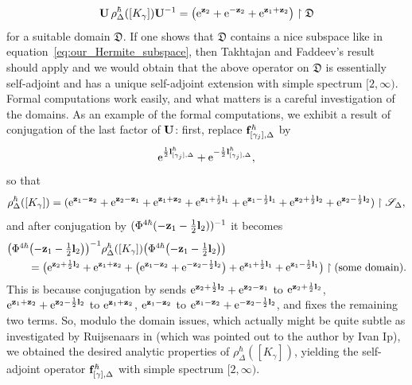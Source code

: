 \documentclass[10pt,a4paper]{amsart}
\numberwithin{equation}{section}
\theoremstyle{definition}
\begin{document}
\[
{\bf U} \, \rho^\hbar_\Delta([K_\gamma]) {\bf U}^{-1} = \bigl( {\rm e}^{ {\bf z}_2 } + {\rm e}^{ - {\bf z}_2 } + {\rm e}^{{\bf z}_1 + {\bf z}_2}\bigr) \restriction \mathfrak{D}
\]
for a suitable domain $\mathfrak{D}$. If one shows that $\mathfrak{D}$ contains a nice subspace like in equation~\eqref{eq:our_Hermite_subspace}, then Takhtajan and Faddeev's result \cite{FT} should apply and we would obtain that the above operator on $\mathfrak{D}$ is essentially self-adjoint and has a unique self-adjoint extension with simple spectrum $[2,\infty)$. Formal computations work easily, and what matters is a careful investigation of the domains. As an example of the formal computations, we exhibit a result of conjugation of the last factor of ${\bf U}$: first, replace ${\bf f}^\hbar_{[\gamma_j],\Delta}$ by
\[
{\rm e}^{ \frac{1}{2} {\bf l}^\hbar_{[\gamma_j],\Delta}} + {\rm e}^{ - \frac{1}{2} {\bf l}^\hbar_{[\gamma_j],\Delta}},
\]
 so that
\[
\rho^\hbar_\Delta([K_\gamma])
= ( {\rm e}^{ {\bf z}_1 - {\bf z}_2 } + {\rm e}^{{\bf z}_2 - {\bf z}_1} + {\rm e}^{{\bf z}_1 + {\bf z}_2} + {\rm e}^{{\bf z}_1 + \frac{1}{2} {\bf l}_1} + {\rm e}^{{\bf z}_1 - \frac{1}{2} {\bf l}_1} + {\rm e}^{{\bf z}_2 + \frac{1}{2} {\bf l}_2} + {\rm e}^{{\bf z}_2 - \frac{1}{2} {\bf l}_2} )\restriction \mathscr{S}_\Delta,
\]
and after conjugation by $(\Phi^{4\hbar}(- {\bf z}_1 - \frac{1}{2} {\bf l}_2))^{-1}$ it becomes
\begin{align*}
& \textstyle \bigl(\Phi^{4\hbar}\bigl(- {\bf z}_1 - \tfrac{1}{2} {\bf l}_2\bigr)\bigr)^{-1} \rho^\hbar_\Delta([K_\gamma]) \bigl(\Phi^{4\hbar}\bigl(- {\bf z}_1 - \tfrac{1}{2} {\bf l}_2\bigr)\bigr) \\
& \qquad{}= \bigl({\rm e}^{{\bf z}_2 + \frac{1}{2} {\bf l}_2} + {\rm e}^{{\bf z}_1+{\bf z}_2} + \bigl({\rm e}^{{\bf z}_1-{\bf z}_2} + {\rm e}^{-{\bf z}_2 - \frac{1}{2} {\bf l}_2}\bigr)
+ {\rm e}^{{\bf z}_1 + \frac{1}{2} {\bf l}_1} + {\rm e}^{{\bf z}_1 - \frac{1}{2} {\bf l}_1}\bigr)\restriction{\mbox{(some domain)}}.
\end{align*}
This is because conjugation by  sends ${\rm e}^{{\bf z}_2 + \frac{1}{2} {\bf l}_2} + {\rm e}^{{\bf z}_2 - {\bf z}_1}$ to ${\rm e}^{{\bf z}_2 + \frac{1}{2} {\bf l}_2}$, ${\rm e}^{{\bf z}_1 + {\bf z}_2} + {\rm e}^{{\bf z}_2 - \frac{1}{2} {\bf l}_2}$ to ${\rm e}^{{\bf z}_1+{\bf z}_2}$, ${\rm e}^{{\bf z}_1-{\bf z}_2}$ to ${\rm e}^{{\bf z}_1 - {\bf z}_2} + {\rm e}^{-{\bf z}_2 - \frac{1}{2} {\bf l}_2}$, and fixes the remaining two terms. So, modulo the domain issues, which actually might be quite subtle as investigated by Ruijsenaars in \cite{Ruijsenaars} (which was pointed out to the author by Ivan Ip), we obtained the desired analytic properties of $\rho^\hbar_\Delta([K_\gamma])$, yielding the self-adjoint operator ${\bf f}^\hbar_{[\gamma],\Delta}$ with simple spectrum $[2,\infty)$.
\end{document}
